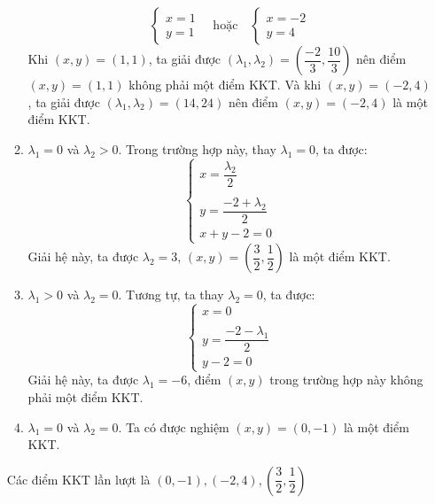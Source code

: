 \begin{solution}
\begin{enumerate}[label=(\alph*)]
\begin{enumerate}[label=(\roman*)]
\begin{equation}
\begin{cases}
                    x = 1 \\
                    y = 1
                \end{cases}
                \quad
                \text{hoặc}
                \quad
                \begin{cases}
                    x = -2 \\
                    y = 4
                \end{cases}
            \end{equation}
            Khi $(x, y) = (1, 1)$, ta giải được $(\lambda_1, \lambda_2) = \left(\dfrac{-2}{3}, \dfrac{10}{3}\right)$ nên điểm $(x, y) = (1, 1)$ không phải một điểm KKT. Và khi $(x, y) = (-2, 4)$, ta giải được $(\lambda_1, \lambda_2) = (14, 24)$ nên điểm $(x, y) = (-2, 4)$ là một điểm KKT.
            \item $\lambda_1 = 0$ và $\lambda_2 > 0$. Trong trường hợp này, thay $\lambda_1 = 0$, ta được:
            \begin{equation}
                \begin{cases}
                    x = \dfrac{\lambda_2}{2} \\\\
                    y = \dfrac{-2 + \lambda_2}{2}\\
                    x + y - 2 = 0
                \end{cases}
            \end{equation}
            Giải hệ này, ta được $\lambda_2 = 3$, $(x, y) = \left(\dfrac{3}{2}, \dfrac{1}{2}\right)$ là một điểm KKT.
            \item $\lambda_1 > 0$ và $\lambda_2 = 0$. Tương tự, ta thay $\lambda_2 = 0$, ta được:
            \begin{equation}
                \begin{cases}
                    x = 0 \\\\
                    y = \dfrac{-2- \lambda_1}{2}\\
                    y - 2 = 0
                \end{cases}
            \end{equation}
            Giải hệ này, ta được $\lambda_1 =- 6$, điểm $(x, y)$ trong trường hợp này không phải một điểm KKT.
            \item $\lambda_1 = 0$ và $\lambda_2 = 0$. Ta có được nghiệm $(x, y) = (0, -1)$
            là một điểm KKT.
        \end{enumerate}
        Các điểm KKT lần lượt là $(0, -1), (-2, 4), \left(\dfrac{3}{2}, \dfrac{1}{2}\right)$
    \end{enumerate}
\end{solution}

